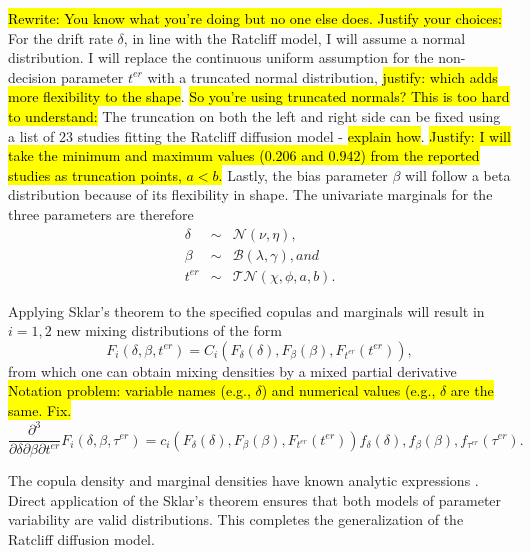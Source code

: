 \documentclass[12pt]{article}
\newcommand{\trish}[1]{\textrm{\hl{#1}}}
\begin{document}
\trish{Rewrite: You know what you're doing but no one else does.
Justify your choices:} For the drift rate $\delta$, in line with the
Ratcliff model, I will assume a normal distribution. I will
replace the continuous uniform assumption for the non-decision
parameter $t^{er}$ with a truncated normal distribution,
\trish{justify: which adds more flexibility to the shape}. \trish{So
you're using truncated normals?  This is too hard to understand:} The
truncation on both the left and right side can be fixed using a list
of $23$ studies fitting the Ratcliff diffusion model
\citep{MatWag2009} - \trish{explain how}. \trish{Justify: I will take the
minimum and maximum values ($0.206$ and $0.942$) from the reported
studies as truncation points, $a < b$.}  Lastly, the bias parameter
$\beta$ will follow a beta distribution because of its flexibility in
shape. The univariate marginals for the three
parameters are therefore
%
\begin{eqnarray}
\delta & \sim & \mathcal{N}(\nu, \eta), \nonumber \\
\beta & \sim & \mathcal{B}(\lambda, \gamma), and \nonumber \\
t^{er} & \sim & \mathcal{TN}(\chi,\phi,a,b).
\end{eqnarray}
 
Applying Sklar's theorem to the specified copulas and marginals will
result in $i = 1, 2$ new mixing distributions of the form
%
\begin{equation}
F_i(\delta,\beta,t^{er}) = C_i(F_{\delta}(\delta),F_{\beta}(\beta),F_{t^{er}}(t^{er})),
\end{equation}
%
from which one can obtain mixing densities by a
mixed partial derivative
%
\trish{Notation problem: variable names (e.g., $\delta$) and numerical
values (e.g., $\delta$ are the same.  Fix.}
%
\begin{equation}
\frac{\partial^3}{\partial\delta
                  \partial\beta
                  \partial t^{er}} F_i(\delta,\beta,\tau^{er}) 
   = c_i(F_{\delta}(\delta),
         F_{\beta}(\beta),
         F_{t^{er}}(t^{er}))
         f_{\delta}(\delta),f_{\beta}(\beta),f_{\tau^{er}}(\tau^{er}).
\end{equation}
 
The copula density and marginal densities have known analytic
expressions
\citep{Nel2007,CasBer2002,JohKot1994,JohKot1995}.  Direct application
of the Sklar's theorem ensures that both models of parameter
variability are valid distributions. This completes the generalization of the Ratcliff
diffusion model.
    
\end{document}
